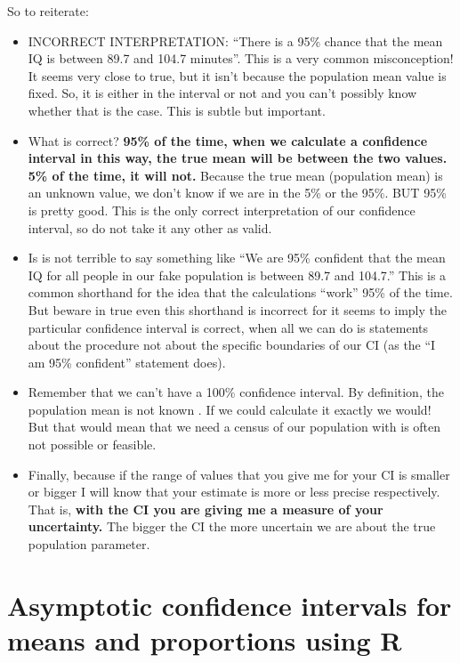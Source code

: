 \documentclass[
]{book}
\providecommand{\tightlist}{%
  \setlength{\itemsep}{0pt}\setlength{\parskip}{0pt}}
\begin{document}
So to reiterate:

\begin{itemize}
\tightlist
\item
  INCORRECT INTERPRETATION: ``There is a 95\% chance that the mean IQ is between 89.7 and 104.7 minutes''. This is a very common misconception! It seems very close to true, but it isn't because the population mean value is fixed. So, it is either in the interval or not and you can't possibly know whether that is the case. This is subtle but important.
\item
  What is correct? \textbf{95\% of the time, when we calculate a confidence interval in this way, the true mean will be between the two values. 5\% of the time, it will not.} Because the true mean (population mean) is an unknown value, we don't know if we are in the 5\% or the 95\%. BUT 95\% is pretty good. This is the only correct interpretation of our confidence interval, so do not take it any other as valid.
\item
  Is is not terrible to say something like ``We are 95\% confident that the mean IQ for all people in our fake population is between 89.7 and 104.7.'' This is a common shorthand for the idea that the calculations ``work'' 95\% of the time. But beware in true even this shorthand is incorrect for it seems to imply the particular confidence interval is correct, when all we can do is statements about the procedure not about the specific boundaries of our CI (as the ``I am 95\% confident'' statement does).
\item
  Remember that we can't have a 100\% confidence interval. By definition, the population mean is not known . If we could calculate it exactly we would! But that would mean that we need a census of our population with is often not possible or feasible.
\item
  Finally, because if the range of values that you give me for your CI is smaller or bigger I will know that your estimate is more or less precise respectively. That is, \textbf{with the CI you are giving me a measure of your uncertainty.} The bigger the CI the more uncertain we are about the true population parameter.
\end{itemize}

\hypertarget{asymptotic-confidence-intervals-for-means-and-proportions-using-r}{%
\section{Asymptotic confidence intervals for means and proportions using R}\label{asymptotic-confidence-intervals-for-means-and-proportions-using-r}}
\end{document}
